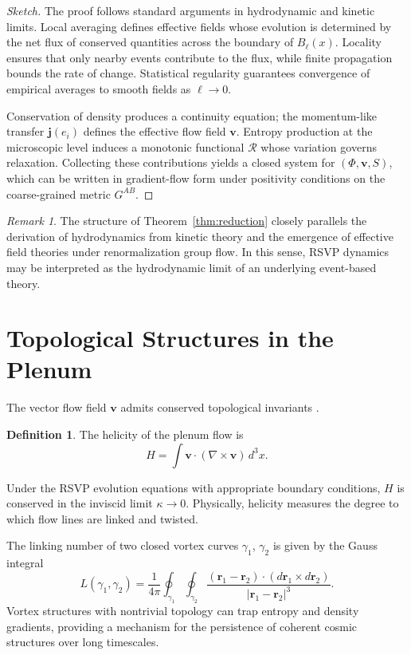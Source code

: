 \documentclass[12pt,a4paper]{article}
\theoremstyle{plain}
\theoremstyle{definition}
\newtheorem{definition}{Definition}
\theoremstyle{remark}
\newtheorem{remark}{Remark}
\begin{document}
\begin{proof}[Sketch]
The proof follows standard arguments in hydrodynamic and kinetic limits.
Local averaging defines effective fields whose evolution is determined
by the net flux of conserved quantities across the boundary of
$B_\ell(x)$. Locality ensures that only nearby events contribute to
the flux, while finite propagation bounds the rate of change.
Statistical regularity guarantees convergence of empirical averages to
smooth fields as $\ell \to 0$.

Conservation of density produces a continuity equation; the
momentum-like transfer $\mathbf{j}(e_i)$ defines the effective flow
field $\mathbf{v}$. Entropy production at the microscopic level induces
a monotonic functional $\mathcal{R}$ whose variation governs relaxation.
Collecting these contributions yields a closed system for
$(\Phi,\mathbf{v},S)$, which can be written in gradient-flow form under
positivity conditions on the coarse-grained metric $G^{AB}$.
\end{proof}

\begin{remark}
The structure of Theorem~\ref{thm:reduction} closely parallels the
derivation of hydrodynamics from kinetic theory and the emergence of
effective field theories under renormalization group flow. In this sense,
RSVP dynamics may be interpreted as the hydrodynamic limit of an
underlying event-based theory.
\end{remark}

\section{Topological Structures in the Plenum}

The vector flow field $\mathbf{v}$ admits conserved topological
invariants \cite{ArnoldKhesin}.

\begin{definition}
The helicity of the plenum flow is
\begin{equation}
H = \int \mathbf{v} \cdot (\nabla \times \mathbf{v})\, d^3x.
\end{equation}
\end{definition}

Under the RSVP evolution equations with appropriate boundary conditions,
$H$ is conserved in the inviscid limit $\kappa \to 0$. Physically,
helicity measures the degree to which flow lines are linked and twisted.

The linking number of two closed vortex curves $\gamma_1$, $\gamma_2$
is given by the Gauss integral
\begin{equation}
L(\gamma_1,\gamma_2) =
\frac{1}{4\pi}
\oint_{\gamma_1}\oint_{\gamma_2}
\frac{(\mathbf{r}_1 - \mathbf{r}_2)
      \cdot (d\mathbf{r}_1 \times d\mathbf{r}_2)}
     {|\mathbf{r}_1 - \mathbf{r}_2|^3}.
\end{equation}
Vortex structures with nontrivial topology can trap entropy and density
gradients, providing a mechanism for the persistence of coherent
cosmic structures over long timescales.
\end{document}
